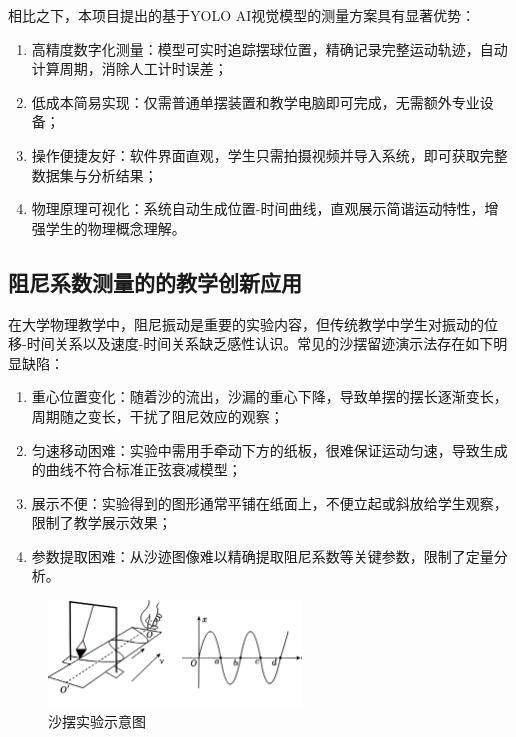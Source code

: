 相比之下，本项目提出的基于YOLO AI视觉模型的测量方案具有显著优势：

\begin{enumerate}[leftmargin=*]
    \item 高精度数字化测量：模型可实时追踪摆球位置，精确记录完整运动轨迹，自动计算周期，消除人工计时误差；
    
    \item 低成本简易实现：仅需普通单摆装置和教学电脑即可完成，无需额外专业设备；
    
    \item 操作便捷友好：软件界面直观，学生只需拍摄视频并导入系统，即可获取完整数据集与分析结果；
    
    \item 物理原理可视化：系统自动生成位置-时间曲线，直观展示简谐运动特性，增强学生的物理概念理解。
    
\end{enumerate}

\subsection{阻尼系数测量的的教学创新应用}

在大学物理教学中，阻尼振动是重要的实验内容，但传统教学中学生对振动的位移-时间关系以及速度-时间关系缺乏感性认识。常见的沙摆留迹演示法存在如下明显缺陷：

\begin{enumerate}[leftmargin=*]
    \item 重心位置变化：随着沙的流出，沙漏的重心下降，导致单摆的摆长逐渐变长，周期随之变长，干扰了阻尼效应的观察；
    
    \item 匀速移动困难：实验中需用手牵动下方的纸板，很难保证运动匀速，导致生成的曲线不符合标准正弦衰减模型；
    
    \item 展示不便：实验得到的图形通常平铺在纸面上，不便立起或斜放给学生观察，限制了教学展示效果；
    
    \item 参数提取困难：从沙迹图像难以精确提取阻尼系数等关键参数，限制了定量分析。
\end{enumerate}

\begin{figure}[H]
    \centering
    \includegraphics[width=0.6\textwidth]{figures/沙摆}
    \caption{沙摆实验示意图}
    \label{fig:sand_pendulum}
\end{figure}

